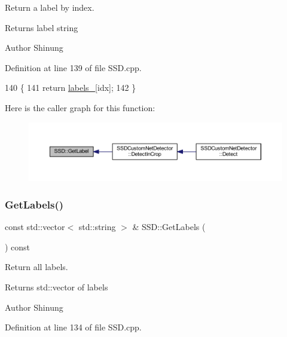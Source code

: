 Return a label by index. 

\begin{DoxyReturn}{Returns}
label string 
\end{DoxyReturn}
\begin{DoxyAuthor}{Author}
Shinung 
\end{DoxyAuthor}


Definition at line 139 of file S\+S\+D.\+cpp.


\begin{DoxyCode}
140 \{
141     \textcolor{keywordflow}{return} \mbox{\hyperlink{class_s_s_d_a1c4d34f2dda5d4ca2dfabbebff7a0ddb}{labels\_}}[idx];
142 \}
\end{DoxyCode}
Here is the caller graph for this function\+:\nopagebreak
\begin{figure}[H]
\begin{center}
\leavevmode
\includegraphics[width=350pt]{class_s_s_d_ac5c69f839f08bfa37dd33a66331f6fa3_icgraph}
\end{center}
\end{figure}
\mbox{\label{class_s_s_d_aca3c228118b686923b97cd120cf057c5}} 
\subsubsection{\texorpdfstring{Get\+Labels()}{GetLabels()}}
{\footnotesize\ttfamily const std\+::vector$<$ std\+::string $>$ \& S\+S\+D\+::\+Get\+Labels (\begin{DoxyParamCaption}{ }\end{DoxyParamCaption}) const}



Return all labels. 

\begin{DoxyReturn}{Returns}
std\+::vector of labels 
\end{DoxyReturn}
\begin{DoxyAuthor}{Author}
Shinung 
\end{DoxyAuthor}


Definition at line 134 of file S\+S\+D.\+cpp.


